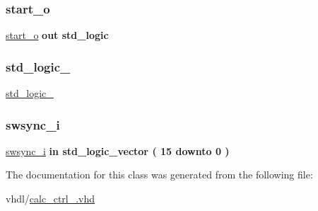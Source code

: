 \mbox{\label{classcalc__ctrl_a6668aebe332a7b7161887353bd928a5b}} 
\subsubsection{\texorpdfstring{start\+\_\+o}{start\_o}}
{\footnotesize\ttfamily \hyperlink{classcalc__ctrl_a6668aebe332a7b7161887353bd928a5b}{start\+\_\+o} {\bfseries \textcolor{keywordflow}{out}\textcolor{vhdlchar}{ }} {\bfseries \textcolor{comment}{std\+\_\+logic}\textcolor{vhdlchar}{ }} \hspace{0.3cm}{\ttfamily [Port]}}

\mbox{\label{classcalc__ctrl_acd03516902501cd1c7296a98e22c6fcb}} 
\subsubsection{\texorpdfstring{std\+\_\+logic\+\_}{std\_logic\_1164}}
{\footnotesize\ttfamily \hyperlink{classcalc__ctrl_acd03516902501cd1c7296a98e22c6fcb}{std\+\_\+logic\+\_}\hspace{0.3cm}{\ttfamily [Package]}}

\mbox{\label{classcalc__ctrl_a8f274a58bd077b3f0604e897f5fd8d06}} 
\subsubsection{\texorpdfstring{swsync\+\_\+i}{swsync\_i}}
{\footnotesize\ttfamily \hyperlink{classcalc__ctrl_a8f274a58bd077b3f0604e897f5fd8d06}{swsync\+\_\+i} {\bfseries \textcolor{keywordflow}{in}\textcolor{vhdlchar}{ }} {\bfseries \textcolor{comment}{std\+\_\+logic\+\_\+vector}\textcolor{vhdlchar}{ }\textcolor{vhdlchar}{(}\textcolor{vhdlchar}{ }\textcolor{vhdlchar}{ } \textcolor{vhdldigit}{15} \textcolor{vhdlchar}{ }\textcolor{keywordflow}{downto}\textcolor{vhdlchar}{ }\textcolor{vhdlchar}{ } \textcolor{vhdldigit}{0} \textcolor{vhdlchar}{ }\textcolor{vhdlchar}{)}\textcolor{vhdlchar}{ }} \hspace{0.3cm}{\ttfamily [Port]}}



The documentation for this class was generated from the following file\+:\begin{DoxyCompactItemize}
\item 
vhdl/\hyperlink{calc__ctrl___8vhd}{calc\+\_\+ctrl\+\_\+.\+vhd}\end{DoxyCompactItemize}
